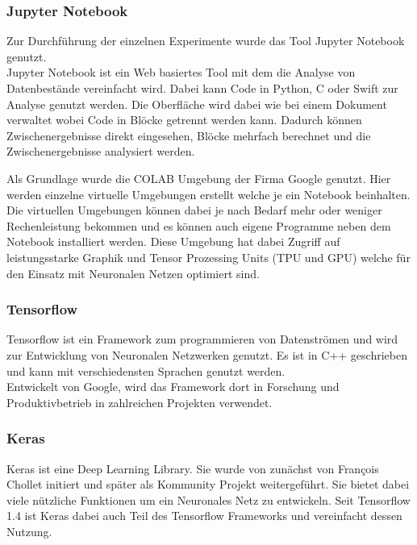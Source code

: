 \documentclass[
]{article}
\begin{document}
\hypertarget{header-n17}{%
\subsubsection{Jupyter Notebook}\label{header-n17}}

Zur Durchführung der einzelnen Experimente wurde das Tool Jupyter
Notebook genutzt.\\
Jupyter Notebook ist ein Web basiertes Tool mit dem die Analyse von
Datenbestände vereinfacht wird. Dabei kann Code in Python, C oder Swift
zur Analyse genutzt werden. Die Oberfläche wird dabei wie bei einem
Dokument verwaltet wobei Code in Blöcke getrennt werden kann. Dadurch
können Zwischenergebnisse direkt eingesehen, Blöcke mehrfach berechnet
und die Zwischenergebnisse analysiert werden.

Als Grundlage wurde die COLAB Umgebung der Firma Google genutzt. Hier
werden einzelne virtuelle Umgebungen erstellt welche je ein Notebook
beinhalten. Die virtuellen Umgebungen können dabei je nach Bedarf mehr
oder weniger Rechenleistung bekommen und es können auch eigene Programme
neben dem Notebook installiert werden. Diese Umgebung hat dabei Zugriff
auf leistungsstarke Graphik und Tensor Prozessing Units (TPU und GPU)
welche für den Einsatz mit Neuronalen Netzen optimiert sind.

\hypertarget{header-n20}{%
\subsubsection{Tensorflow}\label{header-n20}}

Tensorflow ist ein Framework zum programmieren von Datenströmen und wird
zur Entwicklung von Neuronalen Netzwerken genutzt. Es ist in C++
geschrieben und kann mit verschiedensten Sprachen genutzt werden. \\
Entwickelt von Google, wird das Framework dort in Forschung und
Produktivbetrieb in zahlreichen Projekten verwendet.

\hypertarget{header-n22}{%
\subsubsection{Keras}\label{header-n22}}

Keras ist eine Deep Learning Library. Sie wurde von zunächst von
François Chollet initiert und später als Kommunity Projekt
weitergeführt. Sie bietet dabei viele nützliche Funktionen um ein
Neuronales Netz zu entwickeln. Seit Tensorflow 1.4 ist Keras dabei auch
Teil des Tensorflow Frameworks und vereinfacht dessen Nutzung.
\end{document}

